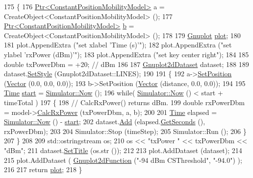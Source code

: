 \begin{DoxyCode}
175 \{
176   \hyperlink{classns3_1_1Ptr}{Ptr<ConstantPositionMobilityModel>} a = 
      CreateObject<ConstantPositionMobilityModel> ();
177   \hyperlink{classns3_1_1Ptr}{Ptr<ConstantPositionMobilityModel>} \hyperlink{buildings__pathloss_8m_a21ad0bd836b90d08f4cf640b4c298e7c}{b} = 
      CreateObject<ConstantPositionMobilityModel> ();
178 
179   \hyperlink{classns3_1_1Gnuplot}{Gnuplot} \hyperlink{lte__amc_8m_a5942306abe9f005572e4344e3cdef528}{plot};
180 
181   plot.AppendExtra (\textcolor{stringliteral}{"set xlabel 'Time (s)'"});
182   plot.AppendExtra (\textcolor{stringliteral}{"set ylabel 'rxPower (dBm)'"});
183   plot.AppendExtra (\textcolor{stringliteral}{"set key center right"});
184 
185   \textcolor{keywordtype}{double} txPowerDbm = +20; \textcolor{comment}{// dBm}
186 
187   \hyperlink{classns3_1_1Gnuplot2dDataset}{Gnuplot2dDataset} dataset;
188 
189   dataset.\hyperlink{classns3_1_1Gnuplot2dDataset_a7a3d6b6c2bd7d32a82f5715bae37c886}{SetStyle} (Gnuplot2dDataset::LINES);
190 
191   \{
192     a->\hyperlink{classns3_1_1MobilityModel_ac584b3d5a309709d2f13ed6ada1e7640}{SetPosition} (\hyperlink{classns3_1_1Vector3D_a7e59b47bc94c9cb1dadff68c1d0112d8}{Vector} (0.0, 0.0, 0.0));
193     b->SetPosition (\hyperlink{classns3_1_1Vector3D_a7e59b47bc94c9cb1dadff68c1d0112d8}{Vector} (distance, 0.0, 0.0));
194 
195     \hyperlink{classns3_1_1Time}{Time} \hyperlink{namespacevisualizer_1_1core_a2a35e5d8a34af358b508dac8635754e0}{start} = \hyperlink{group__simulator_gac3635e2e87f7ce316c89290ee1b01d0d}{Simulator::Now} ();
196     \textcolor{keywordflow}{while}( \hyperlink{group__simulator_gac3635e2e87f7ce316c89290ee1b01d0d}{Simulator::Now} () < start + timeTotal )
197       \{
198         \textcolor{comment}{// CalcRxPower() returns dBm.}
199         \textcolor{keywordtype}{double} rxPowerDbm = model->\hyperlink{classns3_1_1PropagationLossModel_a8b42564e9b03e2197f17aab6692c4fee}{CalcRxPower} (txPowerDbm, a, b);
200 
201         \hyperlink{classns3_1_1Time}{Time} elapsed = \hyperlink{group__simulator_gac3635e2e87f7ce316c89290ee1b01d0d}{Simulator::Now} () - \hyperlink{namespacevisualizer_1_1core_a2a35e5d8a34af358b508dac8635754e0}{start};
202         dataset.\hyperlink{classns3_1_1Gnuplot2dDataset_abd93f7c8fa2d1ed643c09d7fb8d5ef27}{Add} (elapsed.\hyperlink{classns3_1_1Time_a8f20d5c3b0902d7b4320982f340b57c8}{GetSeconds} (), rxPowerDbm);
203 
204         Simulator::Stop (timeStep);
205         Simulator::Run ();
206       \}
207   \}
208 
209   std::ostringstream os;
210   os << \textcolor{stringliteral}{"txPower "} << txPowerDbm << \textcolor{stringliteral}{"dBm"};
211   dataset.\hyperlink{classns3_1_1GnuplotDataset_add68db1296fcadff7255633c0df96e08}{SetTitle} (os.str ());
212 
213   plot.AddDataset (dataset);
214 
215   plot.AddDataset ( \hyperlink{classns3_1_1Gnuplot2dFunction}{Gnuplot2dFunction} (\textcolor{stringliteral}{"-94 dBm CSThreshold"}, \textcolor{stringliteral}{"-94.0"}) );
216 
217   \textcolor{keywordflow}{return} \hyperlink{lte__amc_8m_a5942306abe9f005572e4344e3cdef528}{plot};
218 \}
\end{DoxyCode}


